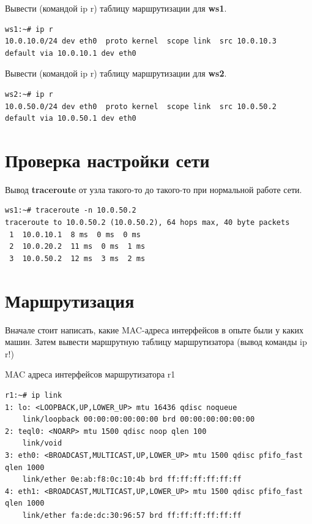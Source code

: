 \documentclass[a4paper,12pt]{article}
\begin{document}
Вывести (командой ip r) таблицу маршрутизации для \textbf{ws1}.

\begin{Verbatim}
ws1:~# ip r
10.0.10.0/24 dev eth0  proto kernel  scope link  src 10.0.10.3 
default via 10.0.10.1 dev eth0 
\end{Verbatim}

Вывести (командой ip r) таблицу маршрутизации для \textbf{ws2}.

\begin{Verbatim}
ws2:~# ip r
10.0.50.0/24 dev eth0  proto kernel  scope link  src 10.0.50.2 
default via 10.0.50.1 dev eth0
\end{Verbatim}


\section{Проверка настройки сети}

Вывод \textbf{traceroute} от узла такого-то до такого-то при нормальной работе сети.

\begin{Verbatim}
ws1:~# traceroute -n 10.0.50.2
traceroute to 10.0.50.2 (10.0.50.2), 64 hops max, 40 byte packets
 1  10.0.10.1  8 ms  0 ms  0 ms
 2  10.0.20.2  11 ms  0 ms  1 ms
 3  10.0.50.2  12 ms  3 ms  2 ms
\end{Verbatim}

\section{Маршрутизация}


Вначале стоит написать, какие MAC-адреса интерфейсов в опыте были у каких машин.
Затем вывести маршрутную таблицу маршрутизатора (вывод команды ip r!)

MAC адреса интерфейсов маршрутизатора r1
\begin{Verbatim}
r1:~# ip link
1: lo: <LOOPBACK,UP,LOWER_UP> mtu 16436 qdisc noqueue 
    link/loopback 00:00:00:00:00:00 brd 00:00:00:00:00:00
2: teql0: <NOARP> mtu 1500 qdisc noop qlen 100
    link/void 
3: eth0: <BROADCAST,MULTICAST,UP,LOWER_UP> mtu 1500 qdisc pfifo_fast qlen 1000
    link/ether 0e:ab:f8:0c:10:4b brd ff:ff:ff:ff:ff:ff
4: eth1: <BROADCAST,MULTICAST,UP,LOWER_UP> mtu 1500 qdisc pfifo_fast qlen 1000
    link/ether fa:de:dc:30:96:57 brd ff:ff:ff:ff:ff:ff
\end{Verbatim}
\end{document}

